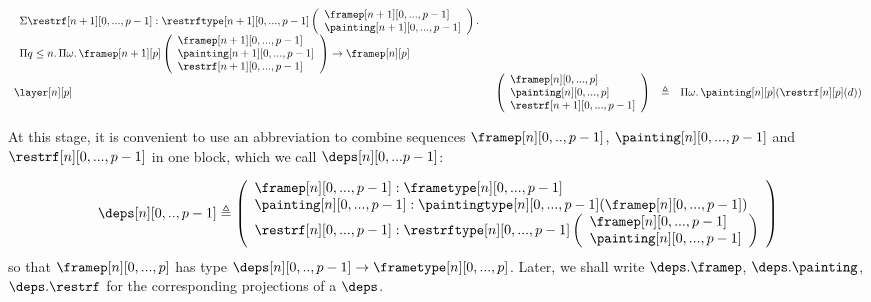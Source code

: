 \documentclass{msc}
\newcommand{\defeq}{\ensuremath{\triangleq}}
\begin{document}
\begin{equation*}
\begin{array}{llcl}
    \begin{array}{l}
      \Sigma \restrf[n+1][0,...,p-1]
      :\restrftype[n+1][0,...,p-1]
      \left(\begin{array}{l}
                \framep[n+1][0,...,p-1]   \\
                \painting[n+1][0,...,p-1] \\
              \end{array}\right).                     \\
      \Pi q\leq n.\,\Pi \omega.\,\framep[n+1][p]
      \left(\begin{array}{l}
                \framep[n+1][0,...,p-1]   \\
                \painting[n+1][0,...,p-1] \\
                \restrf[n+1][0,...,p-1]   \\
              \end{array}\right) \rightarrow  \framep[n][p] \\
    \end{array} \\
    \layer[n][p]                  &
    \left(\begin{array}{l}
              \framep[n][0,...,p]     \\
              \painting[n][0,...,p]   \\
              \restrf[n+1][0,...,p-1] \\
            \end{array}\right)    & \defeq &
    \Pi\omega.\,\painting[n][p](\restrf[n][p](d))
  \end{array}
\end{equation*}

At this stage, it is convenient to use an abbreviation to combine sequences $\framep[n][0,..,p-1]$, $\painting[n][0,...,p-1]$ and $\restrf[n][0,...,p-1]$ in one block, which we call $\deps[n][0,...p-1]$:

\begin{align*}
  \deps[n][0,..,p-1] \defeq
  \left(\begin{array}{l}
            \framep[n][0,...,p-1] :\frametype[n][0,...,p-1] \\
            \painting[n][0,...,p-1] :\paintingtype[n][0,...,p-1]
            (\framep[n][0,...,p-1])                         \\
            \restrf[n][0,...,p-1]  :\restrftype[n][0,...,p-1]
            \left(\begin{array}{l}
                \framep[n][0,...,p-1]   \\
                \painting[n][0,...,p-1] \\
              \end{array}\right)                   \\
          \end{array}\right)
\end{align*}
so that $\framep[n][0,...,p]$ has type $\deps[n][0,..,p-1] \rightarrow \frametype[n][0,...,p]$. Later, we shall write $\deps.\framep$, $\deps.\painting$, $\deps.\restrf$ for the corresponding projections of a $\deps$.
\end{document}

